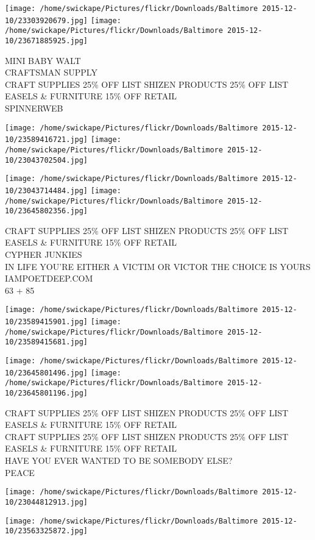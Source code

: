\documentclass[10pt,letterpaper]{article}
\begin{document}
\texttt{[image: /home/swickape/Pictures/flickr/Downloads/Baltimore 2015-12-10/23303920679.jpg]}
\texttt{[image: /home/swickape/Pictures/flickr/Downloads/Baltimore 2015-12-10/23671885925.jpg]}

MINI BABY WALT\\
CRAFTSMAN SUPPLY\\
CRAFT SUPPLIES 25\% OFF LIST SHIZEN PRODUCTS 25\% OFF LIST EASELS \& FURNITURE 15\% OFF RETAIL\\
SPINNERWEB
\pagebreak

\texttt{[image: /home/swickape/Pictures/flickr/Downloads/Baltimore 2015-12-10/23589416721.jpg]}
\texttt{[image: /home/swickape/Pictures/flickr/Downloads/Baltimore 2015-12-10/23043702504.jpg]}

\texttt{[image: /home/swickape/Pictures/flickr/Downloads/Baltimore 2015-12-10/23043714484.jpg]}
\texttt{[image: /home/swickape/Pictures/flickr/Downloads/Baltimore 2015-12-10/23645802356.jpg]}

CRAFT SUPPLIES 25\% OFF LIST SHIZEN PRODUCTS 25\% OFF LIST EASELS \& FURNITURE 15\% OFF RETAIL\\
CYPHER JUNKIES\\
IN LIFE YOU'RE EITHER A VICTIM OR VICTOR THE CHOICE IS YOURS IAMPOETDEEP.COM\\
63 + 85
\pagebreak

\texttt{[image: /home/swickape/Pictures/flickr/Downloads/Baltimore 2015-12-10/23589415901.jpg]}
\texttt{[image: /home/swickape/Pictures/flickr/Downloads/Baltimore 2015-12-10/23589415681.jpg]}

\texttt{[image: /home/swickape/Pictures/flickr/Downloads/Baltimore 2015-12-10/23645801496.jpg]}
\texttt{[image: /home/swickape/Pictures/flickr/Downloads/Baltimore 2015-12-10/23645801196.jpg]}

CRAFT SUPPLIES 25\% OFF LIST SHIZEN PRODUCTS 25\% OFF LIST EASELS \& FURNITURE 15\% OFF RETAIL\\
CRAFT SUPPLIES 25\% OFF LIST SHIZEN PRODUCTS 25\% OFF LIST EASELS \& FURNITURE 15\% OFF RETAIL\\
HAVE YOU EVER WANTED TO BE SOMEBODY ELSE?\\
PEACE
\pagebreak

\texttt{[image: /home/swickape/Pictures/flickr/Downloads/Baltimore 2015-12-10/23044812913.jpg]}

\vspace{0.25in}
\texttt{[image: /home/swickape/Pictures/flickr/Downloads/Baltimore 2015-12-10/23563325872.jpg]}
\end{document}
